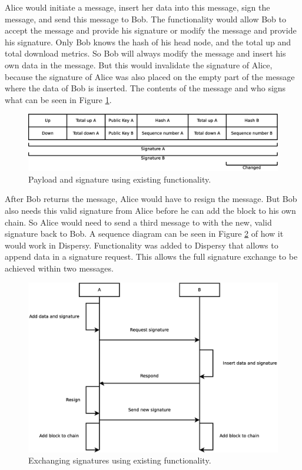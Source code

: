 Alice would initiate a message, insert her data into this message, sign the message, and send this message to Bob.
The functionality would allow Bob to accept the message and provide his signature or
modify the message and provide his signature.
Only Bob knows the hash of his head node, and the total up and total download metrics.
So Bob will always modify the message and insert his own data in the message.
But this would invalidate the signature of Alice,
because the signature of Alice was also placed on the empty part of the message where the data of Bob is inserted.
The contents of the message and who signs what can be seen in Figure \ref{fig:payload-signature-old}.

\begin{figure}
	\centerline{\includegraphics[scale=0.3]{design/figs/signature_old.eps}}
	\caption{Payload and signature using existing functionality.}
	\label{fig:payload-signature-old}
\end{figure}

After Bob returns the message,
Alice would have to resign the message.
But Bob also needs this valid signature from Alice before he can add the block to his own chain.
So Alice would need to send a third message to with the new, valid signature back to Bob.
A sequence diagram can be seen in Figure \ref{fig:exchange-old-sequence} of how it would work in Dispersy.
Functionality was added to Dispersy that allows to append data in a signature request.
This allows the full signature exchange to be achieved within two messages.

\begin{figure}
	\centerline{\includegraphics[scale=0.3]{design/figs/exchange_old.eps}}
	\caption{Exchanging signatures using existing functionality.}
	\label{fig:exchange-old-sequence}
\end{figure}


